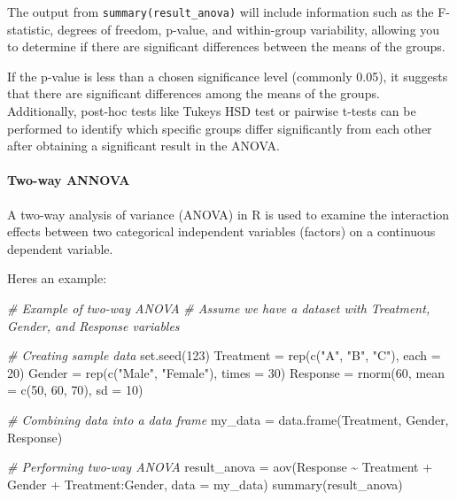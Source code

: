 \documentclass[
]{article}
\newenvironment{Shaded}{}{}
\newcommand{\AttributeTok}[1]{\textcolor[rgb]{0.49,0.56,0.16}{#1}}
\newcommand{\CommentTok}[1]{\textcolor[rgb]{0.38,0.63,0.69}{\textit{#1}}}
\newcommand{\DecValTok}[1]{\textcolor[rgb]{0.25,0.63,0.44}{#1}}
\newcommand{\FunctionTok}[1]{\textcolor[rgb]{0.02,0.16,0.49}{#1}}
\newcommand{\NormalTok}[1]{#1}
\newcommand{\OtherTok}[1]{\textcolor[rgb]{0.00,0.44,0.13}{#1}}
\newcommand{\SpecialCharTok}[1]{\textcolor[rgb]{0.25,0.44,0.63}{#1}}
\newcommand{\StringTok}[1]{\textcolor[rgb]{0.25,0.44,0.63}{#1}}
\begin{document}
The output from \texttt{summary(result\_anova)} will include information
such as the F-statistic, degrees of freedom, p-value, and within-group
variability, allowing you to determine if there are significant
differences between the means of the groups.

If the p-value is less than a chosen significance level (commonly 0.05),
it suggests that there are significant differences among the means of
the groups. Additionally, post-hoc tests like Tukey\textquotesingle s
HSD test or pairwise t-tests can be performed to identify which specific
groups differ significantly from each other after obtaining a
significant result in the ANOVA.

\hypertarget{two-way-annova}{%
\paragraph{Two-way ANNOVA}\label{two-way-annova}}

A two-way analysis of variance (ANOVA) in R is used to examine the
interaction effects between two categorical independent variables
(factors) on a continuous dependent variable.

Here\textquotesingle s an example:

\begin{Shaded}
\begin{Highlighting}[]
\CommentTok{\# Example of two{-}way ANOVA}
\CommentTok{\# Assume we have a dataset with \textquotesingle{}Treatment\textquotesingle{}, \textquotesingle{}Gender\textquotesingle{}, and \textquotesingle{}Response\textquotesingle{} variables}

\CommentTok{\# Creating sample data}
\FunctionTok{set.seed}\NormalTok{(}\DecValTok{123}\NormalTok{)}
\NormalTok{Treatment }\OtherTok{=} \FunctionTok{rep}\NormalTok{(}\FunctionTok{c}\NormalTok{(}\StringTok{"A"}\NormalTok{, }\StringTok{"B"}\NormalTok{, }\StringTok{"C"}\NormalTok{), }\AttributeTok{each =} \DecValTok{20}\NormalTok{)}
\NormalTok{Gender }\OtherTok{=} \FunctionTok{rep}\NormalTok{(}\FunctionTok{c}\NormalTok{(}\StringTok{"Male"}\NormalTok{, }\StringTok{"Female"}\NormalTok{), }\AttributeTok{times =} \DecValTok{30}\NormalTok{)}
\NormalTok{Response }\OtherTok{=} \FunctionTok{rnorm}\NormalTok{(}\DecValTok{60}\NormalTok{, }\AttributeTok{mean =} \FunctionTok{c}\NormalTok{(}\DecValTok{50}\NormalTok{, }\DecValTok{60}\NormalTok{, }\DecValTok{70}\NormalTok{), }\AttributeTok{sd =} \DecValTok{10}\NormalTok{)}

\CommentTok{\# Combining data into a data frame}
\NormalTok{my\_data }\OtherTok{=} \FunctionTok{data.frame}\NormalTok{(Treatment, Gender, Response)}

\CommentTok{\# Performing two{-}way ANOVA}
\NormalTok{result\_anova }\OtherTok{=} \FunctionTok{aov}\NormalTok{(Response }\SpecialCharTok{\textasciitilde{}}\NormalTok{ Treatment }\SpecialCharTok{+}\NormalTok{ Gender }\SpecialCharTok{+}\NormalTok{ Treatment}\SpecialCharTok{:}\NormalTok{Gender, }\AttributeTok{data =}\NormalTok{ my\_data)}
\FunctionTok{summary}\NormalTok{(result\_anova)}
\end{Highlighting}
\end{Shaded}
\end{document}
